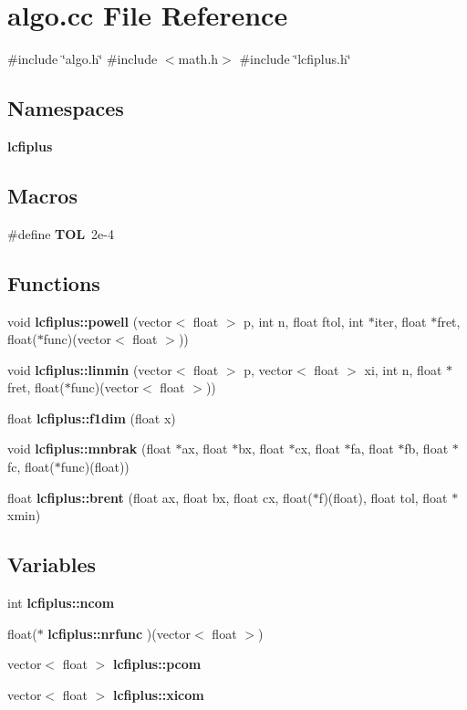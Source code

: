 \section{algo.\+cc File Reference}
\label{algo_8cc}
{\ttfamily \#include \char`\"{}algo.\+h\char`\"{}}\newline
{\ttfamily \#include $<$math.\+h$>$}\newline
{\ttfamily \#include \char`\"{}lcfiplus.\+h\char`\"{}}\newline
\subsection*{Namespaces}
\begin{DoxyCompactItemize}
\item 
 \textbf{ lcfiplus}
\end{DoxyCompactItemize}
\subsection*{Macros}
\begin{DoxyCompactItemize}
\item 
\#define \textbf{ T\+OL}~2e-\/4
\end{DoxyCompactItemize}
\subsection*{Functions}
\begin{DoxyCompactItemize}
\item 
void \textbf{ lcfiplus\+::powell} (vector$<$ float $>$ p, int n, float ftol, int $\ast$iter, float $\ast$fret, float($\ast$func)(vector$<$ float $>$))
\item 
void \textbf{ lcfiplus\+::linmin} (vector$<$ float $>$ p, vector$<$ float $>$ xi, int n, float $\ast$fret, float($\ast$func)(vector$<$ float $>$))
\item 
float \textbf{ lcfiplus\+::f1dim} (float x)
\item 
void \textbf{ lcfiplus\+::mnbrak} (float $\ast$ax, float $\ast$bx, float $\ast$cx, float $\ast$fa, float $\ast$fb, float $\ast$fc, float($\ast$func)(float))
\item 
float \textbf{ lcfiplus\+::brent} (float ax, float bx, float cx, float($\ast$f)(float), float tol, float $\ast$xmin)
\end{DoxyCompactItemize}
\subsection*{Variables}
\begin{DoxyCompactItemize}
\item 
int \textbf{ lcfiplus\+::ncom}
\item 
float($\ast$ \textbf{ lcfiplus\+::nrfunc} )(vector$<$ float $>$)
\item 
vector$<$ float $>$ \textbf{ lcfiplus\+::pcom}
\item 
vector$<$ float $>$ \textbf{ lcfiplus\+::xicom}
\end{DoxyCompactItemize}


